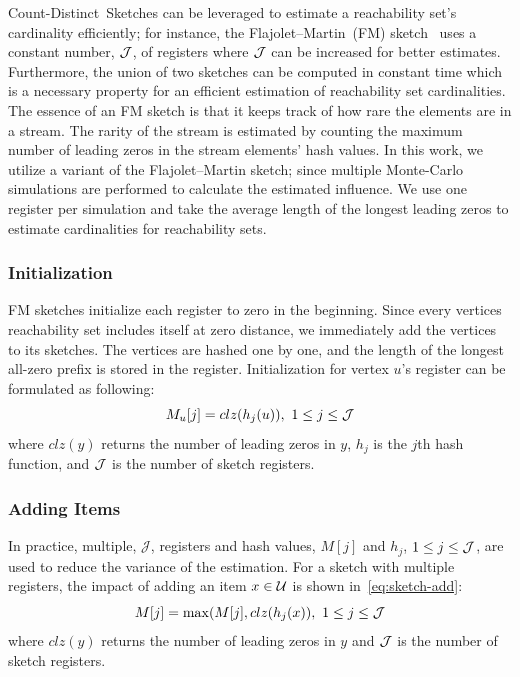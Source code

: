 \documentclass[final,5p,times,twocolumn]{elsarticle}
\begin{document}
Count-Distinct~Sketches can be leveraged to estimate a reachability set's cardinality efficiently; for instance, the Flajolet–Martin~(FM) sketch~\cite{flajolet1985probabilistic} uses a constant number, ${\cal J}$, of registers where ${\cal J}$ can be increased for better estimates. Furthermore, the union of two sketches can be computed in constant time which is a necessary property for an efficient estimation of reachability set cardinalities. The essence of an FM sketch is that it keeps track of how rare the elements are in a stream. The rarity of the stream is estimated by counting the maximum number of leading zeros in the stream elements' hash values. In this work, we utilize a variant of the Flajolet–Martin sketch; since multiple Monte-Carlo simulations are performed to calculate the estimated influence. We use one register per simulation and take the average length of the longest leading zeros to estimate cardinalities for reachability sets. 

\subsubsection{Initialization}
FM sketches initialize each register to zero in the beginning. Since every vertices reachability set includes itself at zero distance, we immediately add the vertices to its sketches. The vertices are hashed one by one, and the length of the longest all-zero prefix is stored in the register. Initialization for vertex $u$'s register can be formulated as following:
\begin{equation}
    \label{eq:sketch-add}
    M_u[j] = clz(h_j(u)),~1 \leq j \leq {\cal J}
\end{equation} where $clz(y)$ returns the number of leading zeros in $y$, $h_j$ is the $j$th hash function, and ${\cal J}$ is the number of sketch registers.


\subsubsection{Adding Items}

In practice, multiple, ${\mathcal J}$, registers and hash values, $M[j]$ and $h_j$, $1 \leq j \leq {\cal J}$, are used to reduce the variance of the estimation. For a sketch with multiple registers, the impact of adding an item $x \in \cal{U}$ is shown in~\eqref{eq:sketch-add}:
\begin{equation}
    \label{eq:sketch-add}
    M[j] = \max(M[j], clz(h_j(x)),~1 \leq j \leq {\cal J}
\end{equation} where $clz(y)$ returns the number of leading zeros in $y$ and ${\cal J}$ is the number of sketch registers.
\end{document}
